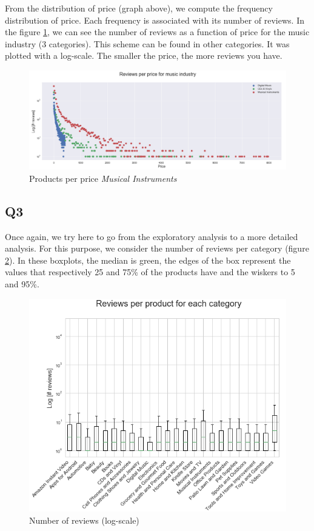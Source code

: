 \documentclass[11pt]{article}
\begin{document}
From the distribution of price (graph above), we compute the frequency distribution of price. Each frequency is associated with its number of reviews. In the figure \ref{q2d}, we can see the number of reviews as a function of price for the music industry (3 categories). This scheme can be found in other categories. It was plotted with a log-scale. The smaller the price, the more reviews you have. 

\begin{figure}[!h]
\centering
\includegraphics[width=1\linewidth]{q2d.png}
\caption{Products per price {\em Musical Instruments}}
\label{q2d}
\end{figure}

\subsection{Q3}

Once again, we try here to go from the exploratory analysis to a more detailed analysis. For this purpose, we consider the number of reviews per category (figure \ref{q3}). In these boxplots, the median is green, the edges of the box represent the values that respectively 25 and 75\% of the products have and the wiskers to 5 and 95\%. 

\begin{figure}[!h]
\centering
\includegraphics[width=1\linewidth]{q3.png}
\caption{Number of reviews (log-scale)}
\label{q3}
\end{figure}
\end{document}
